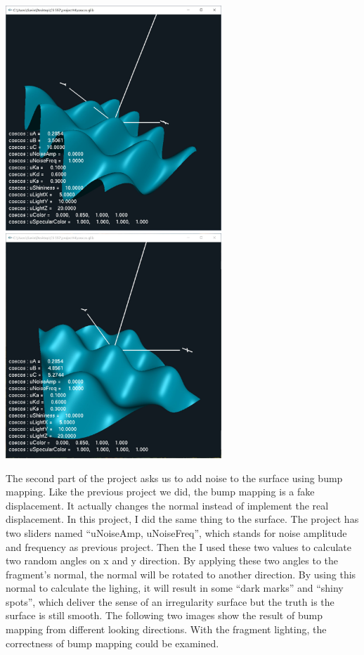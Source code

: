 \documentclass[letterpaper,14pt,titlepage,fleqn]{article}
\begin{document}
\begin{center}
	\includegraphics[width=3.2in]{uB.jpg}
	\includegraphics*[width=3.2in]{uC.jpg}
\end{center}
The second part of the project asks us to add noise to the surface using bump mapping. Like the previous project we did, the bump mapping is a fake displacement. It actually changes the normal instead of implement the real displacement. In this project, I did the same thing to the surface. The project has two sliders named ``uNoiseAmp, uNoiseFreq'', which stands for noise amplitude and frequency as previous project. Then the I used these two values to calculate two random angles on x and y direction. By applying these two angles to the fragment's normal, the normal will be rotated to another direction. By using this normal to calculate the lighing, it will result in some ``dark marks'' and ``shiny spots'', which deliver the sense of an irregularity surface but the truth is the surface is still smooth. The following two images show the result of bump mapping from different looking directions. With the fragment lighting, the correctness of bump mapping could be examined.
\end{document}
